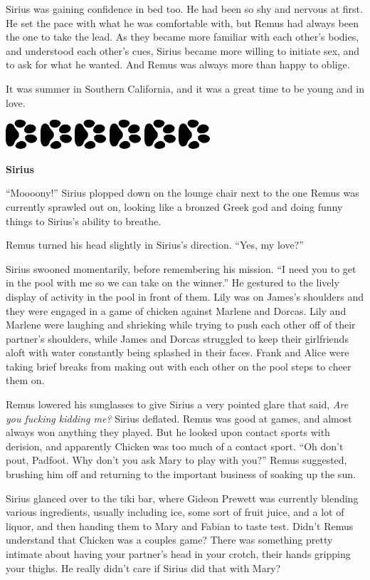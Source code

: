 \documentclass[12pt,twoside,openright]{memoir}
\newcommand{\dogPrintRule}{	
	\begin{center}
		\hspace{.5em}
		\includegraphics[angle=60]{dogprint.pdf}
		\hspace{.5em}
		\includegraphics[angle=120]{dogprint.pdf}
		\hspace{.5em}
		\includegraphics[angle=60]{dogprint.pdf}
		\hspace{.5em}
		\includegraphics[angle=120]{dogprint.pdf}
		\hspace{.5em}
		\includegraphics[angle=60]{dogprint.pdf}
		\hspace{.5em}
		\includegraphics[angle=120]{dogprint.pdf}
		\hspace{.5em}
	\end{center}
}
\begin{document}
Sirius was gaining confidence in bed too. He had been so shy and nervous at first. He set the pace with what he was comfortable with, but Remus had always been the one to take the lead. As they became more familiar with each other's bodies, and understood each other's cues, Sirius became more willing to initiate sex, and to ask for what he wanted. And Remus was always more than happy to oblige. 

It was summer in Southern California, and it was a great time to be young and in love.

\dogPrintRule

\textbf{Sirius} 

``Moooony!'' Sirius plopped down on the lounge chair next to the one Remus was currently sprawled out on, looking like a bronzed Greek god and doing funny things to Sirius's ability to breathe.

Remus turned his head slightly in Sirius's direction. ``Yes, my love?''

Sirius swooned momentarily, before remembering his mission. ``I need you to get in the pool with me so we can take on the winner.'' He gestured to the lively display of activity in the pool in front of them. Lily was on James's shoulders and they were engaged in a game of chicken against Marlene and Dorcas. Lily and Marlene were laughing and shrieking while trying to push each other off of their partner's shoulders, while James and Dorcas struggled to keep their girlfriends aloft with water constantly being splashed in their faces. Frank and Alice were taking brief breaks from making out with each other on the pool steps to cheer them on.

Remus lowered his sunglasses to give Sirius a very pointed glare that said, \textit{Are you fucking kidding me?} Sirius deflated. Remus was good at games, and almost always won anything they played. But he looked upon contact sports with derision, and apparently Chicken was too much of a contact sport. ``Oh don't pout, Padfoot. Why don't you ask Mary to play with you?'' Remus suggested, brushing him off and returning to the important business of soaking up the sun.

Sirius glanced over to the tiki bar, where Gideon Prewett was currently blending various ingredients, usually including ice, some sort of fruit juice, and a lot of liquor, and then handing them to Mary and Fabian to taste test. Didn't Remus understand that Chicken was a couples game? There was something pretty intimate about having your partner's head in your crotch, their hands gripping your thighs. He really didn't care if Sirius did that with Mary?
\end{document}
